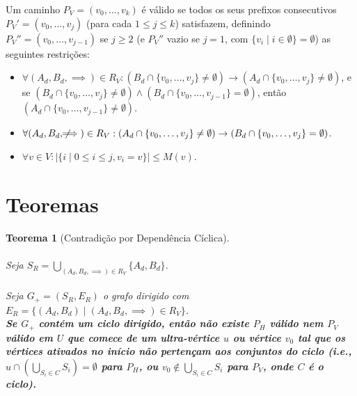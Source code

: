 \documentclass{article}
\newtheorem{theorem}{Teorema}
\begin{document}
Um caminho \( P_V = (v_0, \dots, v_k) \) é válido se todos os seus prefixos consecutivos \( P_V' = (v_0, \dots, v_j) \) (para cada \( 1 \leq j \leq k \)) satisfazem, definindo \( P_V'' = (v_0, \dots, v_{j-1}) \) se \( j \geq 2 \) (e \( P_V'' \) vazio se \( j = 1 \), com \( \{v_i \mid i \in \emptyset \} = \emptyset \)) as seguintes restrições:

\begin{itemize}
    \item \( \forall (A_d, B_d, \implies) \in R_V: (B_d \cap \{v_0, \dots, v_j\} \neq \emptyset) \to (A_d \cap \{v_0, \dots, v_j\} \neq \emptyset) \), e se \( (B_d \cap \{v_0, \dots, v_j\} \neq \emptyset) \wedge (B_d \cap \{v_0, \dots, v_{j-1}\} = \emptyset) \), então \( (A_d \cap \{v_0, \dots, v_{j-1}\} \neq \emptyset) \).
    \item \( \forall (A_d, B_d, \not\!\!\!\implies) \in R_V: (A_d \cap \{v_0, \dots, v_j\} \neq \emptyset) \to (B_d \cap \{v_0, \dots, v_j\} = \emptyset) \).
    \item \( \forall v \in V: |\{ i \mid 0 \leq i \leq j, v_i = v \}| \leq M(v) \).
\end{itemize}

\section{Teoremas}

\begin{theorem}[Contradição por Dependência Cíclica]
\hfill
\\
\\
Seja \( S_R = \bigcup_{(A_d, B_d, \implies) \in R_V} \{ A_d, B_d \} \).
\\
\\
Seja \( G_{+} = (S_R, E_R) \) o grafo dirigido com \( E_R = \{ (A_d, B_d) \mid (A_d, B_d, \implies) \in R_V \} \).
\\

\textbf{Se \( G_{+} \) contém um ciclo dirigido, então não existe \( P_H \) válido nem \( P_V \) válido em \( U \) que comece de um ultra-vértice \( u \) ou vértice \( v_0 \) tal que os vértices ativados no início não pertençam aos conjuntos do ciclo (i.e., \( u \cap \left( \bigcup_{S_i \in C} S_i \right) = \emptyset \) para \( P_H \), ou \( v_0 \notin \bigcup_{S_i \in C} S_i \) para \( P_V \), onde \( C \) é o ciclo).}
\end{theorem}
\end{document}

